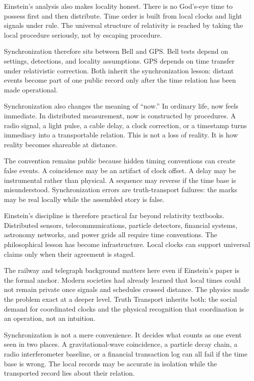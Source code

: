 Einstein's analysis also makes locality honest. There is no God's-eye time
to possess first and then distribute. Time order is built from local
clocks and light signals under rule. The universal structure of relativity
is reached by taking the local procedure seriously, not by escaping
procedure.

Synchronization therefore sits between Bell and GPS. Bell tests depend on
settings, detections, and locality assumptions. GPS depends on time
transfer under relativistic correction. Both inherit the synchronization
lesson: distant events become part of one public record only after the
time relation has been made operational.

Synchronization also changes the meaning of ``now.'' In ordinary life,
now feels immediate. In distributed measurement, now is constructed by
procedures. A radio signal, a light pulse, a cable delay, a clock
correction, or a timestamp turns immediacy into a transportable relation.
This is not a loss of reality. It is how reality becomes shareable at
distance.

The convention remains public because hidden timing conventions can create
false events. A coincidence may be an artifact of clock offset. A delay
may be instrumental rather than physical. A sequence may reverse if the
time base is misunderstood. Synchronization errors are truth-transport
failures: the marks may be real locally while the assembled story is
false.

Einstein's discipline is therefore practical far beyond relativity
textbooks. Distributed sensors, telecommunications, particle detectors,
financial systems, astronomy networks, and power grids all require time
conventions. The philosophical lesson has become infrastructure. Local
clocks can support universal claims only when their agreement is staged.

The railway and telegraph background matters here even if Einstein's
paper is the formal anchor. Modern societies had already learned that
local times could not remain private once signals and schedules crossed
distance. The physics made the problem exact at a deeper level. Truth
Transport inherits both: the social demand for coordinated clocks and the
physical recognition that coordination is an operation, not an
intuition.

Synchronization is not a mere convenience. It decides what counts as one
event seen in two places. A gravitational-wave coincidence, a particle
decay chain, a radio interferometer baseline, or a financial transaction
log can all fail if the time base is wrong. The local records may be
accurate in isolation while the transported record lies about their
relation.

